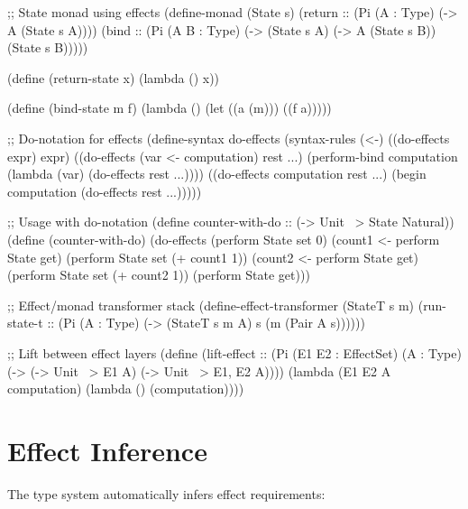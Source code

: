 \begin{example}
\begin{lambdustcode}
;; State monad using effects
(define-monad (State s)
  (return :: (Pi (A : Type) (-> A (State s A))))
  (bind :: (Pi (A B : Type) (-> (State s A) (-> A (State s B)) (State s B)))))

(define (return-state x) 
  (lambda () x))

(define (bind-state m f)
  (lambda ()
    (let ((a (m)))
      ((f a)))))

;; Do-notation for effects  
(define-syntax do-effects
  (syntax-rules (<-)
    ((do-effects expr) expr)
    ((do-effects (var <- computation) rest ...)
     (perform-bind computation (lambda (var) (do-effects rest ...))))
    ((do-effects computation rest ...)
     (begin computation (do-effects rest ...)))))

;; Usage with do-notation
(define counter-with-do :: (-> Unit ~> {State} Natural))
(define (counter-with-do)
  (do-effects
    (perform State set 0)
    (count1 <- perform State get) 
    (perform State set (+ count1 1))
    (count2 <- perform State get)
    (perform State set (+ count2 1))
    (perform State get)))

;; Effect/monad transformer stack
(define-effect-transformer (StateT s m)
  (run-state-t :: (Pi (A : Type) (-> (StateT s m A) s (m (Pair A s))))))

;; Lift between effect layers
(define (lift-effect :: (Pi (E1 E2 : EffectSet) (A : Type)
                           (-> (-> Unit ~> E1 A) (-> Unit ~> {E1, E2} A))))
  (lambda (E1 E2 A computation)
    (lambda () (computation))))
\end{lambdustcode}
\end{example}

\section{Effect Inference}
\label{sec:effect-inference}


The type system automatically infers effect requirements:

